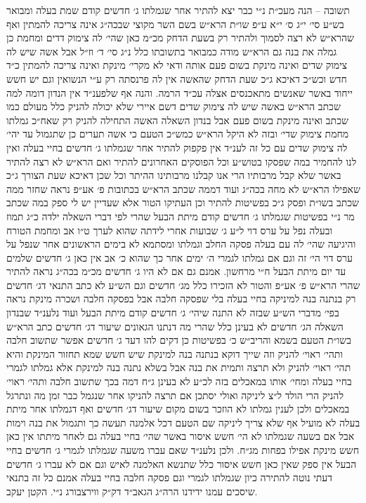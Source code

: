 \documentclass[12pt, openany]{book}
\begin{document}
\begin{multicols}{2}
תשובה – הנה מעכ״ת נ״י כבר יצא להתיר אחר שגמלתו ג׳ חדשים קודם שמת בעלה ומבואר בש״ע סי׳ י״ג ס׳ י״א ע״פ שו״ת הרא״ש בשם השר מקוצי שבכה״ג אינה צריכה להמתין ואף שהרא״ש לא רצה לסמוך ולהתיר רק בשעת הדחק מכ״מ כאן שהי׳ לה צימוק דדים ומחמת כן גמלה את בנה גם הרא״ש מודה כמבואר בתשובתו כלל נ״ג סי׳ ד׳ וז״ל אבל אשה שיש לה צימוק שדים ואינה מינקת בשום פעם אותה ודאי לא מקרי׳ מינקת ואינה צריכה להמתין כ״ד חדש וכש״כ דאיכא ג״כ שעת הדחק שהאשה אין לה פרנסתה רק ע״י הנשואין וגם יש חשש ייחוד באשר שאנשים מתאכנסים אצלה עכ״ד הרמה. והנה אף שלפענ״ד אין הנדון דומה למה שכתב הרא״ש באשה שיש לה צימוק שדים דשם איירי שלא יכולה להניק כלל מעולם כמו שכתב ואינה מינקת בשום פעם אבל בנדון השאלה האשה התחילה להניק רק שאח״כ גמלתו מחמת צימוק שדי׳ ובזה לא היקל הרא״ש כמש״כ הטעם כי אשה תערים כן שתגמול עד יהי׳ לה צימוק שדים עם כל זה לענ״ד אין פקפוק להתיר אחר שגמלתו ג׳ חדשים בחיי בעלה ואין לנו להחמיר במה שפסקו בטוש״ע וכל הפוסקים האחרונים להתיר ואם הרא״ש לא רצה להתיר באשר שלא קבל מרבותיו הרי אנו קבלנו מרבותינו ההיתר וכל שכן דאיכא שעת הצורך ג״כ שאפילו הרא״ש לא מחה בכה״ג ועוד דממה שכתב הרא״ש בכתובות פ׳ אע״פ נראה שחזר ממה שכתב בשו״ת ופסק ג״כ בפשיטות להתיר וכן העתיקו הטור אלא שעדיין יש לי ספק במה שכתב מר נ״י בפשיטות שגמלתו ג׳ חדשים קודם מיתת הבעל שהרי לפי דברי השאלה ילדה כ״ג תמוז ובעלה נפל על ערס דוי ל״ע ג׳ שבועות אחרי לידתה שהוא לערך ט״ו אב ומחמת הטורח והיגיעה שהי׳ לה עם בעלה פסקה החלב וגמלתו ומסתמא לא בימים הראשונים אחר שנפל על ערס דוי הי׳ זה וגם אם גמלתו לגמרי ה׳ ימים אחר כך שהוא כ׳ אב אין כאן ג׳ חדשים שלמים עד יום מיתת הבעל ח״י מרחשון. אמנם גם אם לא היו ג׳ חדשים מכ״מ בכה״ג נראה להתיר שהרי הרא״ש פ׳ אע״פ והטור לא הזכירו כלל מג׳ חדשים וגם הש״ע לא כתב התנאי דג׳ חדשים רק בנתנה בנה למיניקה בחיי בעלה בלי שפסקה חלבה אבל בפסקה חלבה ושכרה מינקת נראה בפי׳ מדברי הש״ע שבזה לא התנה שיהי׳ ג׳ חדשים קודם מיתת הבעל ועוד נלענ״ד שבנדון השאלה הג׳ חדשים לא בעינן כלל שהרי מה דנתנו הגאונים שיעור דג׳ חדשים כתב הרא״ש בשו״ת הטעם בשמא והריב״ש כ׳ בפשיטות כן דקים להו דעד ג׳ חדשים אפשר שתשוב חלבה ותהי׳ ראוי׳ להניק וזה שייך דוקא בנתנה בנה למינקת שיש חשש שמא תחזור המינקת והיא תהי׳ ראוי׳ להניק ולא תרצה ותמית את בנה אבל בשלא נתנה בנה למינקת אלא גמלתו לגמרי בחיי בעלה ומחי׳ אותו במאכלים בזה לכ״ע לא בעינן ג״ח דמה בכך שתשוב חלבה ותהי׳ ראוי׳ להניק הרי הולד ל״צ ליניקה ואולי יסתכן אם תרצה להניקו אחר שנגמל כבר זמן מה ונתרגל במאכלים ולכן לענין גמלתו לא הוזכר בשום מקום שיעור דג׳ חדשים ואף דגמלתו אחר מיתת בעלה לא מועיל אף שלא צריך ליניקה שם הטעם דכל אלמנה תעשה כך ותגמול את בנה וימות אבל אם בשעה שגמלתו לא הי׳ חשש איסור באשר שהי׳ בחיי בעלה גם לאחר מיתתו אין כאן חשש מינקת אפילו בפחות מג״ח. ולכן נלענ״ד שאם עברו משעה שגמלתו לגמרי ג׳ חדשים בחיי הבעל אין ספק שאין כאן חשש איסור כלל שתנשא האלמנה לאיש וגם אם לא עברו ג׳ חדשים דעתי נוטה להתירה כיון שגמלתו לגמרי וגם פסקה חלבה בחיי בעלה אמנם כל זה בתנאי שיסכים עמנו ידידנו הרה״ג הגאב״ד דק״ק ווירצבורג נ״י. הקטן יעקב.\\\vspace{0pt}

\end{multicols}\newpage
\end{document}
